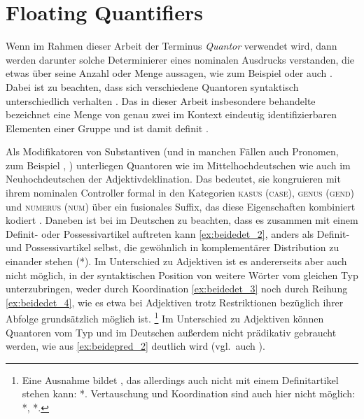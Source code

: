 \section{Floating Quantifiers}
\label{sec:floatquant}

Wenn im Rahmen dieser Arbeit der Terminus \textit{Quantor} verwendet wird, dann
werden darunter solche Determinierer eines nominalen Ausdrucks verstanden, die
etwas über seine Anzahl oder Menge aussagen, wie zum Beispiel  oder auch . Dabei ist zu beachten, dass sich verschiedene
Quantoren syntaktisch unterschiedlich verhalten
\autocites[27--28]{pittner1995}[11--12]{haspelmath1997}. Das in dieser Arbeit
insbesondere behandelte  bezeichnet eine Menge von genau zwei
im Kontext eindeutig identifizierbaren Elementen einer Gruppe
\autocite[vgl.][307]{keenan2006} und ist damit definit
\autocite[265--268]{lyons1999}.

Als Modifikatoren von Substantiven (und in manchen Fällen auch Pronomen, zum
Beispiel , ) unterliegen Quantoren wie
 im Mittelhochdeutschen wie auch  im Neuhochdeutschen
der Adjektivdeklination. Das bedeutet, sie kongruieren mit ihrem nominalen
Controller formal in den Kategorien \textsc{kasus} (\textsc{case}),
\textsc{genus} (\textsc{gend}) und \textsc{numerus} (\textsc{num}) über ein
fusionales Suffix, das diese Eigenschaften kombiniert kodiert
\autocites(vgl.~auch
\cref{sec:ctrltarg,sec:lfgkongr})[181--184]{ksw2}[772]{woellstein2022}.
Daneben ist bei  im Deutschen zu beachten, dass es zusammen mit einem
Definit- oder Possessivartikel auftreten kann \cref{ex:beidedet_2}, anders als
Definit- und Possessivartikel selbst, die gewöhnlich in komplementärer
Distribution zu einander stehen (*). Im Unterschied zu
Adjektiven ist es andererseits aber auch nicht möglich, in der syntaktischen
Position von  weitere Wörter vom gleichen Typ unterzubringen, weder
durch Koordination \cref{ex:beidedet_3} noch durch Reihung
\cref{ex:beidedet_4}, wie es etwa bei Adjektiven trotz Restriktionen
bezüglich ihrer Abfolge grundsätzlich möglich ist.%
%
	\footnote{Eine Ausnahme bildet , das allerdings auch nicht
		mit einem Definitartikel stehen kann: *.
		Vertauschung und Koordination sind auch hier nicht möglich: *, *.%
	}
%
Im Unterschied zu Adjektiven können Quantoren vom Typ  und 
im Deutschen außerdem nicht prädikativ gebraucht werden, wie aus
\cref{ex:beidepred_2} deutlich wird (vgl.~auch \cite[181,
Anm.~1]{merchant1996}).


